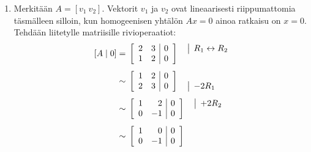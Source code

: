 \documentclass[11pt,a4paper]{amsart}
\begin{document}
\begin{solution}
  \leavevmode\par
  \begin{enumerate}[label=(\alph*), leftmargin=*]
    \item Merkitään \(A=[v_1\ v_2]\). Vektorit \(v_1\) ja
      \(v_2\) ovat lineaarisesti riippumattomia täsmälleen silloin,
      kun homogeenisen yhtälön \(Ax=0\) ainoa ratkaisu on \(x=0\).
      Tehdään liitetylle matriisille rivioperaatiot:
      \[
        \begin{aligned}
          [A\mid 0] &={}
          \left[
            \begin{array}{rr|r}
              2 & 3 & 0 \\
              1 & 2 & 0
            \end{array}
          \right]
          \quad
          \begin{array}{@{}l@{}}
            \smash{\rowop{R_1\leftrightarrow R_2}} \\
            {}
          \end{array}
          \\[1ex]
          &\sim{}
          \left[
            \begin{array}{rr|r}
              1 & 2 & 0 \\
              2 & 3 & 0
            \end{array}
          \right]
          \quad
          \begin{array}{@{}l@{}}
            {} \\
            \smash{\rowop{-2R_1}}
          \end{array}
          \\[1ex]
          &\sim{}
          \left[
            \begin{array}{rr|r}
              1 & 2 & 0 \\
              0 & -1 & 0
            \end{array}
          \right]
          \quad
          \begin{array}{@{}l@{}}
            \smash{\rowop{+2R_2}} \\
            {}
          \end{array}
          \\[1ex]
          &\sim{}
          \left[
            \begin{array}{rr|r}
              1 & 0 & 0 \\
              0 & -1 & 0
            \end{array}
          \right]

\end{aligned}\]
\end{enumerate}
\end{solution}
\end{document}
